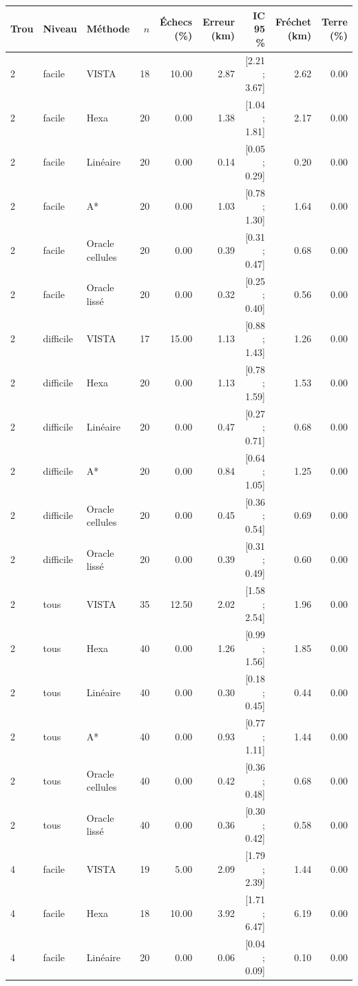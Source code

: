 \begin{table}[t]
\centering\small
\begin{tabular}{lllrrrrrr}
\toprule
Trou & Niveau & Méthode & $n$ & Échecs (\%) & Erreur (km) & IC 95 \% & Fréchet (km) & Terre (\%) \\
\midrule
2 & facile & VISTA & 18 & 10.00 & 2.87 & [2.21 ; 3.67] & 2.62 & 0.00 \\
2 & facile & Hexa & 20 & 0.00 & 1.38 & [1.04 ; 1.81] & 2.17 & 0.00 \\
2 & facile & Linéaire & 20 & 0.00 & 0.14 & [0.05 ; 0.29] & 0.20 & 0.00 \\
2 & facile & A* & 20 & 0.00 & 1.03 & [0.78 ; 1.30] & 1.64 & 0.00 \\
2 & facile & Oracle cellules & 20 & 0.00 & 0.39 & [0.31 ; 0.47] & 0.68 & 0.00 \\
2 & facile & Oracle lissé & 20 & 0.00 & 0.32 & [0.25 ; 0.40] & 0.56 & 0.00 \\
2 & difficile & VISTA & 17 & 15.00 & 1.13 & [0.88 ; 1.43] & 1.26 & 0.00 \\
2 & difficile & Hexa & 20 & 0.00 & 1.13 & [0.78 ; 1.59] & 1.53 & 0.00 \\
2 & difficile & Linéaire & 20 & 0.00 & 0.47 & [0.27 ; 0.71] & 0.68 & 0.00 \\
2 & difficile & A* & 20 & 0.00 & 0.84 & [0.64 ; 1.05] & 1.25 & 0.00 \\
2 & difficile & Oracle cellules & 20 & 0.00 & 0.45 & [0.36 ; 0.54] & 0.69 & 0.00 \\
2 & difficile & Oracle lissé & 20 & 0.00 & 0.39 & [0.31 ; 0.49] & 0.60 & 0.00 \\
2 & tous & VISTA & 35 & 12.50 & 2.02 & [1.58 ; 2.54] & 1.96 & 0.00 \\
2 & tous & Hexa & 40 & 0.00 & 1.26 & [0.99 ; 1.56] & 1.85 & 0.00 \\
2 & tous & Linéaire & 40 & 0.00 & 0.30 & [0.18 ; 0.45] & 0.44 & 0.00 \\
2 & tous & A* & 40 & 0.00 & 0.93 & [0.77 ; 1.11] & 1.44 & 0.00 \\
2 & tous & Oracle cellules & 40 & 0.00 & 0.42 & [0.36 ; 0.48] & 0.68 & 0.00 \\
2 & tous & Oracle lissé & 40 & 0.00 & 0.36 & [0.30 ; 0.42] & 0.58 & 0.00 \\
4 & facile & VISTA & 19 & 5.00 & 2.09 & [1.79 ; 2.39] & 1.44 & 0.00 \\
4 & facile & Hexa & 18 & 10.00 & 3.92 & [1.71 ; 6.47] & 6.19 & 0.00 \\
4 & facile & Linéaire & 20 & 0.00 & 0.06 & [0.04 ; 0.09] & 0.10 & 0.00 \\

\end{tabular}
\end{table}
